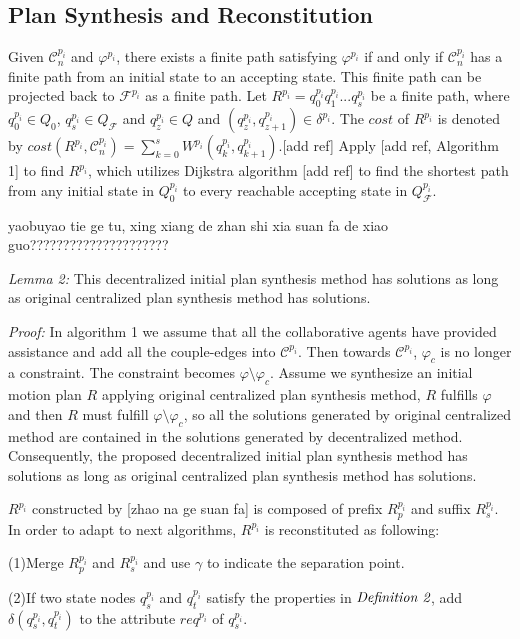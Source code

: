 \documentclass[journal]{IEEEtran}
\begin{document}
\subsection{Plan Synthesis and Reconstitution}
Given $\mathcal{C}^{p_i}_n$ and $\varphi^{p_i}$, there exists a finite path satisfying $\varphi^{p_i}$ if and only if $\mathcal{C}^{p_i}_n$ has a finite path from an initial state to an accepting state. This finite path can be projected back to $\mathcal{F}^{p_i}$ as a finite path. Let $R^{p_i}=q^{p_i}_0 q^{p_i}_1 ... q^{p_i}_s$ be a finite path, where $q^{p_i}_0\in Q_0$, $q^{p_i}_s\in Q_\mathcal{F}$ and $q^{p_i}_z\in Q$ and $(q^{p_i}_z,q^{p_i}_{z+1})\in \delta^{p_i}$. The $cost$ of $R^{p_i}$ is denoted by $cost(R^{p_i},\mathcal{C}^{p_i}_n)=\sum^{s}_{k=0}W^{p_i}(q^{p_i}_k,q^{p_i}_{k+1})$.[add ref] Apply [add ref, Algorithm 1] to find $R^{p_i}$, which utilizes Dijkstra algorithm [add ref] to find the shortest path from any initial state in $Q^{p_i}_0$ to every reachable accepting state in $Q_\mathcal{F}^{p_i}$.

yaobuyao tie ge tu, xing xiang de zhan shi xia suan fa de xiao guo?????????????????????\par
\emph{Lemma 2:} This decentralized initial plan synthesis method has solutions as long as original centralized plan synthesis method has solutions.\par
\emph{Proof:} In algorithm 1 we assume that all the collaborative agents have provided assistance and add all the couple-edges into $\mathcal{C}^{p_i}$. Then towards $\mathcal{C}^{p_i}$, $\varphi_c$ is no longer a constraint. The constraint becomes $\varphi \setminus \varphi_c$. Assume we synthesize an initial motion plan $R$ applying original centralized plan synthesis method, $R$ fulfills $\varphi$ and then $R$ must fulfill $\varphi \setminus \varphi_c$, so all the solutions generated by original centralized method are contained in the solutions generated by decentralized method. Consequently, the proposed decentralized initial plan synthesis method has solutions as long as original centralized plan synthesis method has solutions.\par
$R^{p_i}$ constructed by [zhao na ge suan fa] is composed of prefix $R^{p_i}_p$ and suffix $R^{p_i}_s$. In order to adapt to next algorithms, $R^{p_i}$ is reconstituted as following:\par
(1)Merge $R^{p_i}_p$ and $R^{p_i}_s$ and use $\gamma$ to indicate the separation point.

(2)If two state nodes $q^{p_i}_s$ and $q^{p_i}_t$ satisfy the properties in $\emph{Definition 2}$, add $\delta(q^{p_i}_s,q^{p_i}_t)$ to the attribute $req^{p_i}$ of $q^{p_i}_s$.
\end{document}
